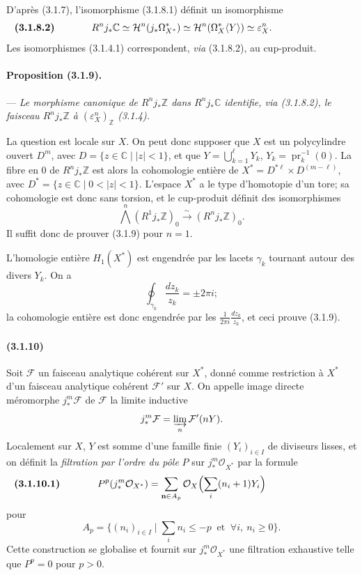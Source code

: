 \documentclass[10pt]{article}
\newcommand{\C}{\mathbb C}
\newcommand{\Z}{\mathbb Z}
\providecommand{\cO}{\mathcal O}
\providecommand{\cO}{\mathcal O}
\begin{document}
D'après (3.1.7), l'isomorphisme (3.1.8.1) définit un isomorphisme
\[
\makebox[\textwidth][s]{\textbf{(3.1.8.2)}\hfill$\displaystyle R^nj_*\C\simeq \mathcal H^n(j_*\Omega_{X^*}^*)\simeq \mathcal H^n(\Omega_X^*\langle Y\rangle)\simeq \varepsilon_X^n.$\hfill\phantom{\textbf{(3.1.8.2)}}}
\]
Les isomorphismes (3.1.4.1) correspondent, \emph{via} (3.1.8.2), au cup-produit.

\paragraph{Proposition (3.1.9).} --- {\itshape Le morphisme canonique de $R^nj_*\Z$ dans $R^nj_*\C$ identifie, via (3.1.8.2), le faisceau $R^nj_*\Z$ à $(\varepsilon_X^n)_\Z$ (3.1.4).}

La question est locale sur $X$. On peut donc supposer que $X$ est un polycylindre ouvert $D^m$, avec $D=\{z\in\C\mid |z|<1\}$, et que $Y=\bigcup_{k=1}^{\ell}Y_k$, $Y_k=\operatorname{pr}_k^{-1}(0)$. La fibre en $0$ de $R^nj_*\Z$ est alors la cohomologie entière de $X^*=D^{*\ell}\times D^{(m-\ell)}$, avec $D^*=\{z\in\C\mid 0<|z|<1\}$.
L'espace $X^*$ a le type d'homotopie d'un tore; sa cohomologie est donc sans torsion, et le cup-produit définit des isomorphismes
\[
\bigwedge^n(R^1j_*\Z)_0\xrightarrow{\sim}(R^nj_*\Z)_0.
\]
Il suffit donc de prouver (3.1.9) pour $n=1$.

L'homologie entière $H_1(X^*)$ est engendrée par les lacets $\gamma_k$ tournant autour des divers $Y_k$. On a
\[
\oint_{\gamma_k}\frac{dz_k}{z_k}=\pm2\pi i;
\]
la cohomologie entière est donc engendrée par les $\frac1{2\pi i}\frac{dz_k}{z_k}$, et ceci prouve (3.1.9).

\paragraph{(3.1.10)} Soit $\mathcal F$ un faisceau analytique cohérent sur $X^*$, donné comme restriction à $X^*$ d'un faisceau analytique cohérent $\mathcal F'$ sur $X$. On appelle image directe méromorphe $j_*^m\mathcal F$ de $\mathcal F$ la limite inductive
\[
j_*^m\mathcal F=\varinjlim_n \mathcal F'(nY).
\]
Localement sur $X$, $Y$ est somme d'une famille finie $(Y_i)_{i\in I}$ de diviseurs lisses, et on définit la \emph{filtration par l'ordre du pôle} $P$ sur $j_*^m\cO_{X^*}$ par la formule
\[
\makebox[\textwidth][s]{\textbf{(3.1.10.1)}\hfill$\displaystyle P^p(j_*^m\cO_{X^*})=\sum_{\mathbf n\in A_p}\cO_X\Bigl(\sum_i(n_i+1)Y_i\Bigr)$\hfill\phantom{\textbf{(3.1.10.1)}}}
\]
pour
\[
A_p=\{(n_i)_{i\in I}\mid \sum_i n_i\le -p\ \text{ et }\ \forall i,\ n_i\ge0\}.
\]
Cette construction se globalise et fournit sur $j_*^m\cO_{X^*}$ une filtration exhaustive telle que $P^p=0$ pour $p>0$.
\end{document}
